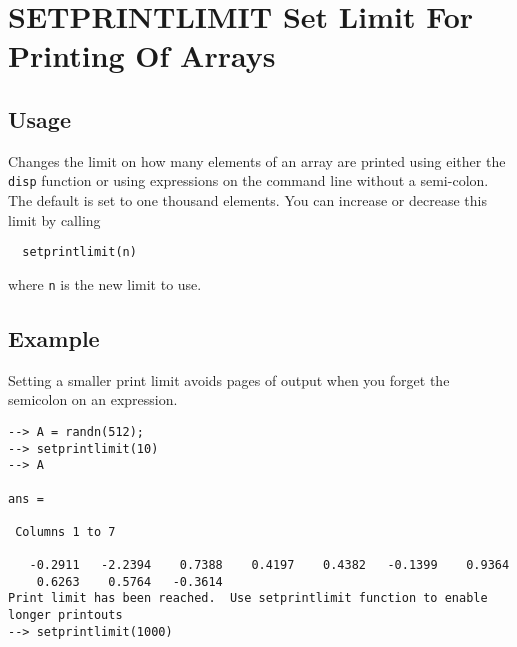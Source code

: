 \section{SETPRINTLIMIT Set Limit For Printing Of Arrays}

\subsection{Usage}

Changes the limit on how many elements of an array are printed
using either the \verb|disp| function or using expressions on the
command line without a semi-colon.  The default is set to 
one thousand elements.  You can increase or decrease this
limit by calling
\begin{verbatim}
  setprintlimit(n)
\end{verbatim}
where \verb|n| is the new limit to use.
\subsection{Example}

Setting a smaller print limit avoids pages of output when you forget the semicolon on an expression.
\begin{verbatim}
--> A = randn(512);
--> setprintlimit(10)
--> A

ans = 

 Columns 1 to 7

   -0.2911   -2.2394    0.7388    0.4197    0.4382   -0.1399    0.9364 
    0.6263    0.5764   -0.3614
Print limit has been reached.  Use setprintlimit function to enable longer printouts
--> setprintlimit(1000)
\end{verbatim}
